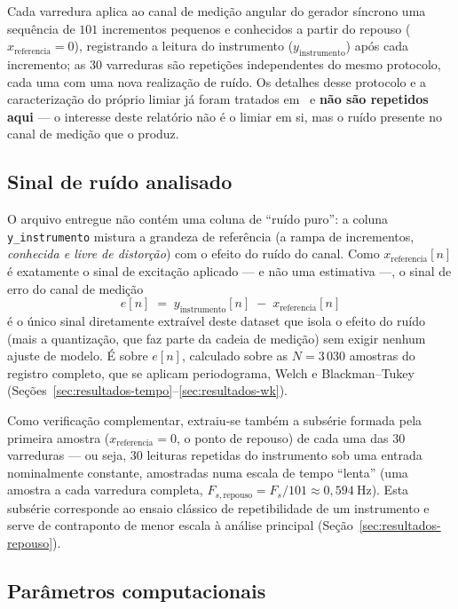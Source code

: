 Cada varredura aplica ao canal de medição angular do gerador síncrono uma sequência de $101$
incrementos pequenos e conhecidos a partir do repouso ($x_{\text{referencia}}=0$), registrando a
leitura do instrumento ($y_{\text{instrumento}}$) após cada incremento; as $30$ varreduras são
repetições independentes do mesmo protocolo, cada uma com uma nova realização de ruído. Os
detalhes desse protocolo e a caracterização do próprio limiar já foram tratados
em~\cite{limiarv1,geracaodadoslimiar} e \textbf{não são repetidos aqui} --- o interesse deste
relatório não é o limiar em si, mas o ruído presente no canal de medição que o produz.

\subsection{Sinal de ruído analisado}
\label{sec:sinal-analisado}

O arquivo entregue não contém uma coluna de ``ruído puro'': a coluna \texttt{y\_instrumento}
mistura a grandeza de referência (a rampa de incrementos, \emph{conhecida e livre de
distorção}) com o efeito do ruído do canal. Como $x_{\text{referencia}}[n]$ é exatamente o sinal
de excitação aplicado --- e não uma estimativa ---, o sinal de erro do canal de medição
\begin{equation}
e[n] \;=\; y_{\text{instrumento}}[n] \;-\; x_{\text{referencia}}[n]
\label{eq:sinal-erro}
\end{equation}
é o único sinal diretamente extraível deste dataset que isola o efeito do ruído (mais a
quantização, que faz parte da cadeia de medição) sem exigir nenhum ajuste de modelo. É sobre
$e[n]$, calculado sobre as $N=3\,030$ amostras do registro completo, que se aplicam periodograma,
Welch e Blackman--Tukey (Seções~\ref{sec:resultados-tempo}--\ref{sec:resultados-wk}).

Como verificação complementar, extraiu-se também a subsérie formada pela primeira amostra
($x_{\text{referencia}}=0$, o ponto de repouso) de cada uma das $30$ varreduras --- ou seja,
$30$ leituras repetidas do instrumento sob uma entrada nominalmente constante, amostradas numa
escala de tempo ``lenta'' (uma amostra a cada varredura completa, $F_{s,\text{repouso}} =
F_s/101 \approx 0{,}594\ \text{Hz}$). Esta subsérie corresponde ao ensaio clássico de
repetibilidade de um instrumento e serve de contraponto de menor escala à análise principal
(Seção~\ref{sec:resultados-repouso}).

\subsection{Parâmetros computacionais}
\label{sec:parametros}

